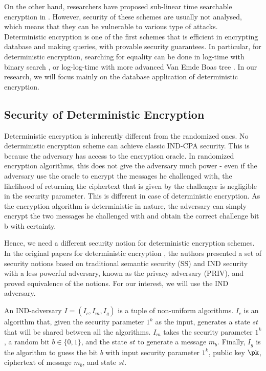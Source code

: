 On the other hand, researchers have proposed sub-linear time searchable encryption in \cite{Ozsoyoglu2004, Agrawal:2004:OPE:1007568.1007632, Hacigumus:2002:ESO:564691.564717, Damiani:2003:BCE:948109.948124, Hore:2004:PIR:1316689.1316752, Iyer2004, Li2005, Hacıgümüş2004, doi:10.1201/1086/44530.13.3.20040701/83065.3, Wang:2006:ESQ:1182635.1164140}. However, security of these schemes are usually not analysed, which means that they can be vulnerable to various type of attacks. Deterministic encryption is one of the first schemes that is efficient in encrypting database and making queries, with provable security guarantees. In particular, for deterministic encryption, searching for equality can be done in log-time with binary search \cite{Williams:1976:MHS:503561.503582}, or log-log-time with more advanced Van Emde Boas tree \cite{VANEMDEBOAS197780}. In our research, we will focus mainly on the database application of deterministic encryption.




\subsection{Security of Deterministic Encryption}
Deterministic encryption is inherently different from the randomized ones. No deterministic encryption scheme can achieve classic IND-CPA security. This is because the adversary has access to the encryption oracle. In randomized encryption algorithms, this does not give the adversary much power - even if the adversary use the oracle to encrypt the messages he challenged with, the likelihood of returning the ciphertext that is given by the challenger is negligible in the security parameter. This is different in case of deterministic encryption. As the encryption algorithm is deterministic in nature, the adversary can simply encrypt the two messages he challenged with and obtain the correct challenge bit b with certainty.

Hence, we need a different security notion for deterministic encryption schemes. In the original papers for deterministic encryption \cite{Bellare2007, Boldyreva2008, Bellare2008}, the authors presented a set of security notions based on traditional semantic security (SS) and IND security with a less powerful adversary, known as the privacy adversary (PRIV), and proved equivalence of the notions. For our interest, we will use the IND adversary.

An IND-adversary $I = (I_c, I_m, I_g)$ is a tuple of non-uniform algorithms. $I_c$ is an algorithm that, given the security parameter $1^k$ as the input, generates a state $st$ that will be shared between all the algorithms. $I_m$ takes the security parameter $1^k$, a random bit $b \in \{0,1\}$, and the state $st$ to generate a message $m_b$. Finally, $I_g$ is the algorithm to guess the bit $b$ with input security parameter $1^k$, public key $\pk$, ciphertext of message $m_b$, and state $st$.

